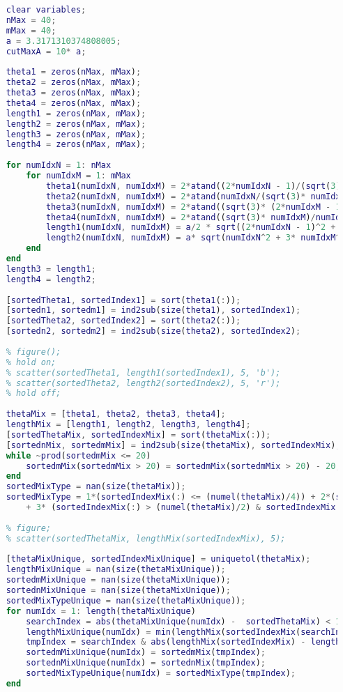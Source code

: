 \begin{lstlisting}[language=Matlab]
    %% Determine the supercell length
    clear variables;
    nMax = 40;
    mMax = 40;
    a = 3.3171310374808005;
    cutMaxA = 10* a;
    
    theta1 = zeros(nMax, mMax);
    theta2 = zeros(nMax, mMax);
    theta3 = zeros(nMax, mMax);
    theta4 = zeros(nMax, mMax);
    length1 = zeros(nMax, mMax);
    length2 = zeros(nMax, mMax);
    length3 = zeros(nMax, mMax);
    length4 = zeros(nMax, mMax);
    
    for numIdxN = 1: nMax
        for numIdxM = 1: mMax
            theta1(numIdxN, numIdxM) = 2*atand((2*numIdxN - 1)/(sqrt(3)* (2*numIdxM - 1)));
            theta2(numIdxN, numIdxM) = 2*atand(numIdxN/(sqrt(3)* numIdxM));
            theta3(numIdxN, numIdxM) = 2*atand((sqrt(3)* (2*numIdxM - 1))/(2*numIdxN - 1));
            theta4(numIdxN, numIdxM) = 2*atand((sqrt(3)* numIdxM)/numIdxN);
            length1(numIdxN, numIdxM) = a/2 * sqrt((2*numIdxN - 1)^2 + 3*(2*numIdxM - 1)^2);
            length2(numIdxN, numIdxM) = a* sqrt(numIdxN^2 + 3* numIdxM^2);
        end
    end
    length3 = length1;
    length4 = length2;
    
    [sortedTheta1, sortedIndex1] = sort(theta1(:));
    [sortedn1, sortedm1] = ind2sub(size(theta1), sortedIndex1);
    [sortedTheta2, sortedIndex2] = sort(theta2(:));
    [sortedn2, sortedm2] = ind2sub(size(theta2), sortedIndex2);
    
    % figure();
    % hold on;
    % scatter(sortedTheta1, length1(sortedIndex1), 5, 'b');
    % scatter(sortedTheta2, length2(sortedIndex2), 5, 'r');
    % hold off;
    
    thetaMix = [theta1, theta2, theta3, theta4];
    lengthMix = [length1, length2, length3, length4];
    [sortedThetaMix, sortedIndexMix] = sort(thetaMix(:));
    [sortednMix, sortedmMix] = ind2sub(size(thetaMix), sortedIndexMix);
    while ~prod(sortedmMix <= 20)
        sortedmMix(sortedmMix > 20) = sortedmMix(sortedmMix > 20) - 20;
    end
    sortedMixType = nan(size(thetaMix));
    sortedMixType = 1*(sortedIndexMix(:) <= (numel(thetaMix)/4)) + 2*(sortedIndexMix(:) > (numel(thetaMix)/4) & sortedIndexMix(:) <= (numel(thetaMix)/2)) ...
        + 3* (sortedIndexMix(:) > (numel(thetaMix)/2) & sortedIndexMix(:) <= (numel(thetaMix)*3/4)) + 4*(sortedIndexMix(:) > (numel(thetaMix)*3/4));
    
    % figure;
    % scatter(sortedThetaMix, lengthMix(sortedIndexMix), 5);
    
    [thetaMixUnique, sortedIndexMixUnique] = uniquetol(thetaMix);
    lengthMixUnique = nan(size(thetaMixUnique));
    sortedmMixUnique = nan(size(thetaMixUnique));
    sortednMixUnique = nan(size(thetaMixUnique));
    sortedMixTypeUnique = nan(size(thetaMixUnique));
    for numIdx = 1: length(thetaMixUnique)
        searchIndex = abs(thetaMixUnique(numIdx) -  sortedThetaMix) < 1e-8;
        lengthMixUnique(numIdx) = min(lengthMix(sortedIndexMix(searchIndex)));
        tmpIndex = searchIndex & abs(lengthMix(sortedIndexMix) - lengthMixUnique(numIdx))< 1e-8;
        sortedmMixUnique(numIdx) = sortedmMix(tmpIndex);
        sortednMixUnique(numIdx) = sortednMix(tmpIndex);
        sortedMixTypeUnique(numIdx) = sortedMixType(tmpIndex);
    end
    

\end{lstlisting}
